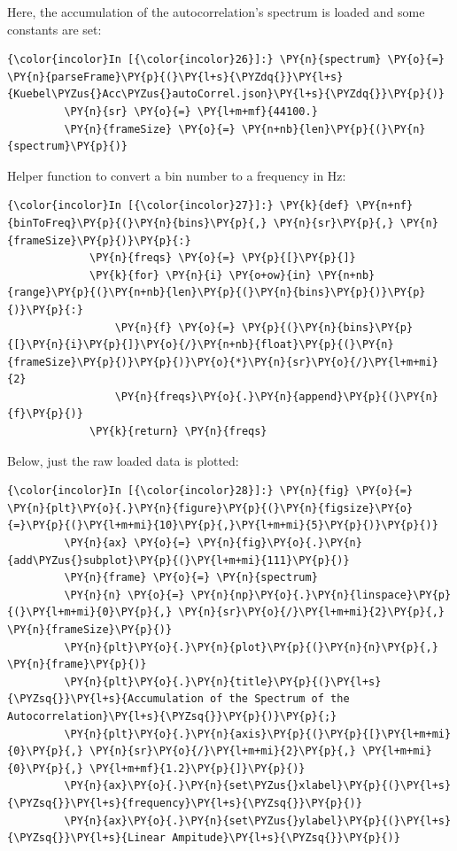     Here, the accumulation of the autocorrelation's spectrum is loaded and
some constants are set:

    \begin{Verbatim}[commandchars=\\\{\}]
{\color{incolor}In [{\color{incolor}26}]:} \PY{n}{spectrum} \PY{o}{=} \PY{n}{parseFrame}\PY{p}{(}\PY{l+s}{\PYZdq{}}\PY{l+s}{Kuebel\PYZus{}Acc\PYZus{}autoCorrel.json}\PY{l+s}{\PYZdq{}}\PY{p}{)}
         \PY{n}{sr} \PY{o}{=} \PY{l+m+mf}{44100.}
         \PY{n}{frameSize} \PY{o}{=} \PY{n+nb}{len}\PY{p}{(}\PY{n}{spectrum}\PY{p}{)}
\end{Verbatim}

    Helper function to convert a bin number to a frequency in Hz:

    \begin{Verbatim}[commandchars=\\\{\}]
{\color{incolor}In [{\color{incolor}27}]:} \PY{k}{def} \PY{n+nf}{binToFreq}\PY{p}{(}\PY{n}{bins}\PY{p}{,} \PY{n}{sr}\PY{p}{,} \PY{n}{frameSize}\PY{p}{)}\PY{p}{:}
             \PY{n}{freqs} \PY{o}{=} \PY{p}{[}\PY{p}{]}
             \PY{k}{for} \PY{n}{i} \PY{o+ow}{in} \PY{n+nb}{range}\PY{p}{(}\PY{n+nb}{len}\PY{p}{(}\PY{n}{bins}\PY{p}{)}\PY{p}{)}\PY{p}{:}
                 \PY{n}{f} \PY{o}{=} \PY{p}{(}\PY{n}{bins}\PY{p}{[}\PY{n}{i}\PY{p}{]}\PY{o}{/}\PY{n+nb}{float}\PY{p}{(}\PY{n}{frameSize}\PY{p}{)}\PY{p}{)}\PY{o}{*}\PY{n}{sr}\PY{o}{/}\PY{l+m+mi}{2}
                 \PY{n}{freqs}\PY{o}{.}\PY{n}{append}\PY{p}{(}\PY{n}{f}\PY{p}{)}
             \PY{k}{return} \PY{n}{freqs}
\end{Verbatim}

    Below, just the raw loaded data is plotted:

    \begin{Verbatim}[commandchars=\\\{\}]
{\color{incolor}In [{\color{incolor}28}]:} \PY{n}{fig} \PY{o}{=} \PY{n}{plt}\PY{o}{.}\PY{n}{figure}\PY{p}{(}\PY{n}{figsize}\PY{o}{=}\PY{p}{(}\PY{l+m+mi}{10}\PY{p}{,}\PY{l+m+mi}{5}\PY{p}{)}\PY{p}{)}
         \PY{n}{ax} \PY{o}{=} \PY{n}{fig}\PY{o}{.}\PY{n}{add\PYZus{}subplot}\PY{p}{(}\PY{l+m+mi}{111}\PY{p}{)}
         \PY{n}{frame} \PY{o}{=} \PY{n}{spectrum}
         \PY{n}{n} \PY{o}{=} \PY{n}{np}\PY{o}{.}\PY{n}{linspace}\PY{p}{(}\PY{l+m+mi}{0}\PY{p}{,} \PY{n}{sr}\PY{o}{/}\PY{l+m+mi}{2}\PY{p}{,} \PY{n}{frameSize}\PY{p}{)}
         \PY{n}{plt}\PY{o}{.}\PY{n}{plot}\PY{p}{(}\PY{n}{n}\PY{p}{,} \PY{n}{frame}\PY{p}{)}
         \PY{n}{plt}\PY{o}{.}\PY{n}{title}\PY{p}{(}\PY{l+s}{\PYZsq{}}\PY{l+s}{Accumulation of the Spectrum of the Autocorrelation}\PY{l+s}{\PYZsq{}}\PY{p}{)}\PY{p}{;}
         \PY{n}{plt}\PY{o}{.}\PY{n}{axis}\PY{p}{(}\PY{p}{[}\PY{l+m+mi}{0}\PY{p}{,} \PY{n}{sr}\PY{o}{/}\PY{l+m+mi}{2}\PY{p}{,} \PY{l+m+mi}{0}\PY{p}{,} \PY{l+m+mf}{1.2}\PY{p}{]}\PY{p}{)}
         \PY{n}{ax}\PY{o}{.}\PY{n}{set\PYZus{}xlabel}\PY{p}{(}\PY{l+s}{\PYZsq{}}\PY{l+s}{frequency}\PY{l+s}{\PYZsq{}}\PY{p}{)}
         \PY{n}{ax}\PY{o}{.}\PY{n}{set\PYZus{}ylabel}\PY{p}{(}\PY{l+s}{\PYZsq{}}\PY{l+s}{Linear Ampitude}\PY{l+s}{\PYZsq{}}\PY{p}{)}
\end{Verbatim}

